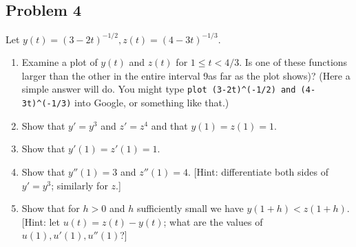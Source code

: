 \documentclass{article}
\begin{document}
\subsection*{Problem 4}
Let $y(t) = (3-2t)^{-1/2}, z(t) = (4-3t)^{-1/3}$.
\begin{enumerate}
	\item Examine a plot of $y(t)$ and $z(t)$ for $1 \leq t < 4/3$.
		Is one of these functions larger than the other in the entire interval
		9as far as the plot shows)?
		(Here a simple answer will do.
		You might type \newline \verb|plot (3-2t)^(-1/2) and (4-3t)^(-1/3)|
		into Google, or something like that.)
	\item Show that $y' = y^3$ and $z' = z^4$ and that $y(1) = z(1) = 1$.
	\item Show that $y'(1) = z'(1) = 1$.
	\item Show that $y''(1) = 3$ and $z''(1) = 4$.
		[Hint: differentiate both sides of $y' = y^3$; similarly for $z$.]
	\item Show that for $h > 0$ and $h$ sufficiently small we have $y(1+h) < z(1+h)$.
		[Hint: let $u(t) = z(t) - y(t)$; what are the values of $u(1),u'(1),u''(1)$?]
\end{enumerate}
\end{document}
